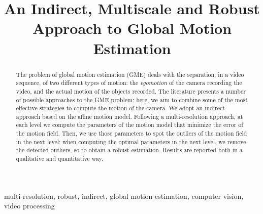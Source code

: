 \documentclass[conference]{IEEEtran}
\begin{document}
\title{An Indirect, Multiscale and Robust Approach to Global Motion Estimation}

\author{
\and
{}
}

\maketitle

\thispagestyle{plain}
\pagestyle{plain}

\begin{abstract}
The problem of global motion estimation (GME) deals with the separation, in a video sequence, of two different types of motion: the \emph{egomotion} of the camera recording the video, and the actual motion of the objects recorded. The literature presents a number of possible approaches to the GME problem; here, we aim to combine some of the most effective strategies to compute the motion of the camera. We adopt an indirect approach based on the affine motion model. Following a multi-resolution approach, at each level we compute the parameters of the motion model that minimize the error of the motion field. Then, we use those parameters to spot the outliers of the motion field in the next level; when computing the optimal parameters in the next level, we remove the detected outliers, so to obtain a robust estimation.
Results are reported both in a qualitative and quantitative way.  
\end{abstract}

\begin{IEEEkeywords}
multi-resolution, robust, indirect, global motion estimation, computer vision, video processing
\end{IEEEkeywords}







{}

\end{document}
